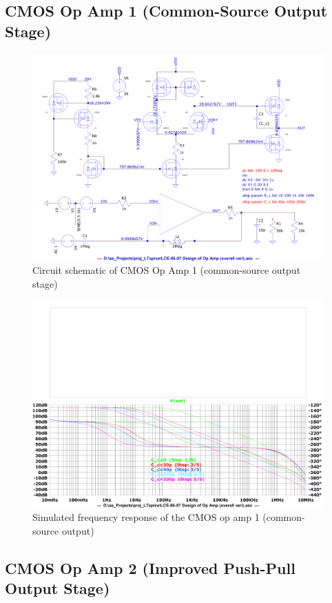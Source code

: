 \documentclass[UTF8]{article}
\begin{document}
\subsection{CMOS Op Amp 1 (Common-Source Output Stage) }

\begin{figure}[H]\centering
    \includegraphics[width=0.91\columnwidth]{assets/op amp 1/CMOS op amp 1 (CS).pdf}
    \caption{Circuit schematic of CMOS Op Amp 1 (common-source output stage)}
    \label{fig: CMOS Op Amp 1}
\end{figure}

\begin{figure}[H]\centering
    \includegraphics[width=0.91\columnwidth]{assets/op amp 1/gain of CMOS op amp 1 copy.pdf}
    \caption{Simulated frequency response of the CMOS op amp 1 (common-source output)}
\end{figure}

\subsection{CMOS Op Amp 2 (Improved Push-Pull Output Stage) }
\end{document}
